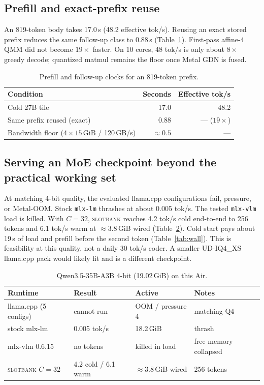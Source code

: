 \documentclass[11pt]{article}
\theoremstyle{definition}
\newcommand{\slotbank}{\textsc{slotbank}}
\begin{document}
\subsection{Prefill and exact-prefix reuse}

An 819-token body takes 17.0\,s (48.2 effective tok/s). Reusing an exact stored prefix reduces the same follow-up class to 0.88\,s (Table~\ref{tab:prefill}). First-pass affine-4 QMM did not become $19{\times}$ faster. On 10 cores, 48 tok/s is only about $8{\times}$ greedy decode; quantized matmul remains the floor once Metal GDN is fused.

\begin{table}[t]
\centering
\caption{Prefill and follow-up clocks for an 819-token prefix.}
\label{tab:prefill}
\small
\begin{tabular}{@{}lrr@{}}
\toprule
Condition & Seconds & Effective tok/s \\
\midrule
Cold 27B tile & 17.0 & 48.2 \\
Same prefix reused (exact) & 0.88 & --- ($19{\times}$) \\
Bandwidth floor ($4{\times}15$\,GiB / 120\,GB/s) & ${\approx}0.5$ & --- \\
\bottomrule
\end{tabular}
\end{table}

\subsection{Serving an MoE checkpoint beyond the practical working set}
\label{sec:eval-moe}

At matching 4-bit quality, the evaluated llama.cpp configurations fail, pressure, or Metal-OOM. Stock \texttt{mlx-lm} thrashes at about 0.005 tok/s. The tested \texttt{mlx-vlm} load is killed. With $C{=}32$, \slotbank{} reaches 4.2 tok/s cold end-to-end to 256 tokens and 6.1 tok/s warm at ${\approx}3.8$\,GiB wired (Table~\ref{tab:moe}). Cold start pays about 19\,s of load and prefill before the second token (Table~\ref{tab:wall}). This is feasibility at this quality, not a daily 30 tok/s coder. A smaller UD-IQ4\_XS llama.cpp pack would likely fit and is a different checkpoint.

\begin{table}[t]
\centering
\caption{Qwen3.5-35B-A3B 4-bit (19.02\,GiB) on this Air.}
\label{tab:moe}
\small
\begin{tabular}{@{}llll@{}}
\toprule
Runtime & Result & Active & Notes \\
\midrule
llama.cpp (5 configs) & cannot run & OOM / pressure 4 & matching Q4 \\
stock mlx-lm & 0.005 tok/s & 18.2\,GiB & thrash \\
mlx-vlm 0.6.15 & no tokens & killed in load & free memory collapsed \\
\slotbank{} $C{=}32$ & 4.2 cold / 6.1 warm & ${\approx}3.8$\,GiB wired & 256 tokens \\
\bottomrule
\end{tabular}
\end{table}
\end{document}
